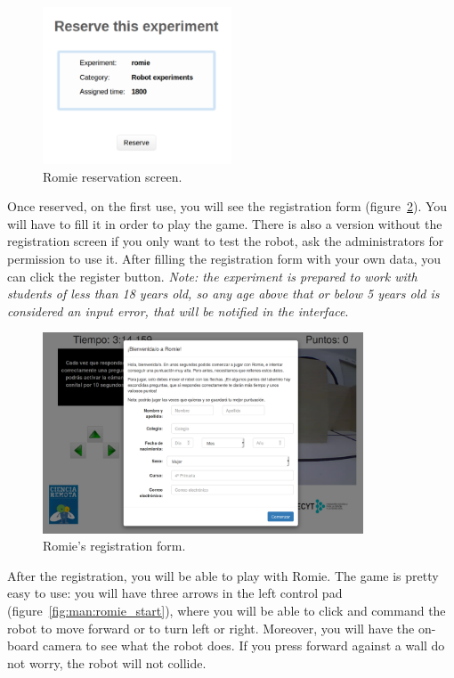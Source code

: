 \begin{figure}[!htbp]
	\centering
	\includegraphics[width=0.5\textwidth]{fig/manuals/trivia/romie-reserve}
	\caption{Romie reservation screen.}
	\label{fig:man:romie_reserve}
\end{figure}

Once reserved, on the first use, you will see the registration form
(figure~\ref{fig:man:romie_register}). You will have to fill it in order to play the game. There is
also a version without the registration screen if you only want to test the robot, ask the
administrators for permission to use it. After filling the registration form  with your own data,
you can click the register button. \emph{Note: the experiment is prepared to work with students of
less than 18 years old, so any age above that or below 5 years old is considered an input error,
that will be notified in the interface}.

\begin{figure}[!htbp]
	\centering
	\includegraphics[width=0.85\textwidth]{fig/manuals/trivia/romie-register}
	\caption{Romie's registration form.}
	\label{fig:man:romie_register}
\end{figure}

After the registration, you will be able to play with Romie. The game is pretty easy to use: you
will have three arrows in the left control pad (figure~\ref{fig:man:romie_start}), where you will be
able to click and command the robot to move forward or to turn left or right. Moreover, you will
have the on-board camera to see what the robot does. If you press forward against a wall do not
worry, the robot will not collide.

